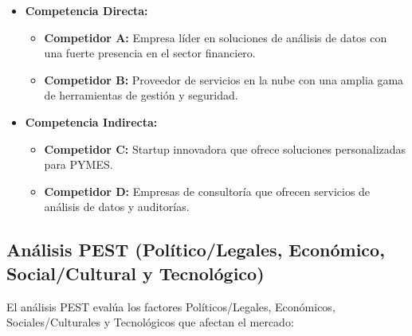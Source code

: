 \documentclass[a4paper,12pt]{article}
\begin{document}
\begin{itemize}
    \item \textbf{Competencia Directa:}
    \begin{itemize}
        \item \textbf{Competidor A:} Empresa líder en soluciones de análisis de datos con una fuerte presencia en el sector financiero.
        \item \textbf{Competidor B:} Proveedor de servicios en la nube con una amplia gama de herramientas de gestión y seguridad.
    \end{itemize}
    \item \textbf{Competencia Indirecta:}
    \begin{itemize}
        \item \textbf{Competidor C:} Startup innovadora que ofrece soluciones personalizadas para PYMES.
        \item \textbf{Competidor D:} Empresas de consultoría que ofrecen servicios de análisis de datos y auditorías.
    \end{itemize}
\end{itemize}

\subsection{Análisis PEST (Político/Legales, Económico, Social/Cultural y Tecnológico)}
El análisis PEST evalúa los factores Políticos/Legales, Económicos, Sociales/Culturales y Tecnológicos que afectan el mercado:
\end{document}
